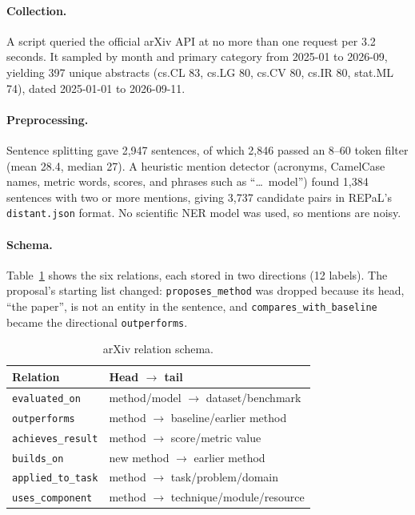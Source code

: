 \paragraph{Collection.} A script queried the official arXiv API at no more than one request per 3.2 seconds. It sampled by month and primary category from 2025-01 to 2026-09, yielding 397 unique abstracts (cs.CL 83, cs.LG 80, cs.CV 80, cs.IR 80, stat.ML 74), dated 2025-01-01 to 2026-09-11.

\paragraph{Preprocessing.} Sentence splitting gave 2,947 sentences, of which 2,846 passed an 8--60 token filter (mean 28.4, median 27). A heuristic mention detector (acronyms, CamelCase names, metric words, scores, and phrases such as ``\ldots\ model'') found 1,384 sentences with two or more mentions, giving 3,737 candidate pairs in REPaL's \texttt{distant.json} format. No scientific NER model was used, so mentions are noisy.

\paragraph{Schema.} Table~\ref{tab:schema} shows the six relations, each stored in two directions (12 labels). The proposal's starting list changed: \texttt{proposes\_method} was dropped because its head, ``the paper'', is not an entity in the sentence, and \texttt{compares\_with\_baseline} became the directional \texttt{outperforms}.

\begin{table}[t]
\centering\footnotesize
\begin{tabular}{p{}p{}}
\toprule
Relation & Head $\rightarrow$ tail \\
\midrule
\texttt{evaluated\_on} & method/model $\rightarrow$ dataset/benchmark \\
\texttt{outperforms} & method $\rightarrow$ baseline/earlier method \\
\texttt{achieves\_result} & method $\rightarrow$ score/metric value \\
\texttt{builds\_on} & new method $\rightarrow$ earlier method \\
\texttt{applied\_to\_task} & method $\rightarrow$ task/problem/domain \\
\texttt{uses\_component} & method $\rightarrow$ technique/module/resource \\
\bottomrule
\end{tabular}
\caption{arXiv relation schema.}
\label{tab:schema}
\end{table}

